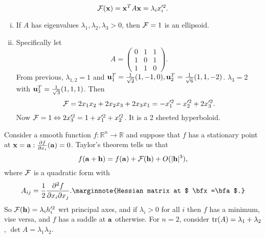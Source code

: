 \documentclass[10pt]{article}
\begin{document}
    \begin{example}[$\mathbb{R}^3$]
        \[
            {\mathcal{F}}({\bf x})={\bf x}^TA{\bf x} = \lambda_i x_i'^2.
        \]
        \begin{enumerate}[(i)]
            \item If $A$ has eigenvalues $\lambda_1,\lambda_2,\lambda_3>0$, then $ {\mathcal{F}}=1 $ is an ellipsoid.
            \item Specifically let 
            \[
                A= \begin{pmatrix}
                    0&1&1\\
                    1&0&1\\
                    1&1&0
                \end{pmatrix}.
            \]
            From previous, $ \lambda_{1,2}=1 $ and $ {\bf u}_1^T=\frac{1}{\sqrt{2}}(1,-1,0), {\bf u}_2^T=\frac{1}{\sqrt{6}}(1,1,-2) $. $ \lambda_3=2 $ with $ {\bf u}_3^T=\frac{1}{\sqrt{3}}(1,1,1) $. Then 
            \[
                {\mathcal{F}} = 2x_1x_2+2x_2x_3+2x_3x_1 = -x_1'^2-x_2'^2+2x_3'^2.
            \]
            Now ${\mathcal{F}}=1 \Leftrightarrow 2x_3'^2=1+x_1'^2+x_2'^2 $. It is a 2 sheeted hyperboloid.
        \end{enumerate}
    \end{example}
    \begin{example}
        Consider a smooth function $ f: \mathbb{R}^{n}\to \mathbb{R} $ and suppose that $f$ has a stationary point at $ {\bf x}={\bf a}: \frac{\partial f}{\partial x_i}({\bf a})=0  $. Taylor's theorem tells us that 
        \[
            f({\bf a}+{\bf h})=f({\bf a})+{\mathcal{F}}({\bf h})+O(|{\bf h}|^3),
        \]
        where ${\mathcal{F}}$ is a quadratic form with
        \[
            A_{ij}=\frac{1}{2} \frac{\partial^2f}{\partial x_i \partial x_j}.\marginnote{Hessian matrix at $ \bfx=\bfa $.} 
        \]
        So $ {\mathcal{F}}({\bf h})=\lambda_i h_i'^2 $ wrt principal axes, and if $ \lambda_i>0 $ for all $i$ then $f$ has a minimum, vise versa, and $f$ has a saddle at ${\bf a}$ otherwise. For $n=2$, consider $ \tr(A)=\lambda_1+\lambda_2 $, $ \det A=\lambda_1\lambda_2 $.
    \end{example}
\end{document}
